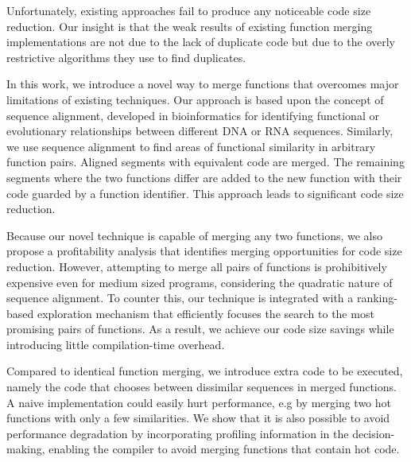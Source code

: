 Unfortunately, existing approaches fail  to produce any noticeable code size reduction.
Our insight is that the weak results of existing function merging implementations are not due to the lack of duplicate code but due to the overly restrictive algorithms they use to find duplicates.


In this work, we introduce a novel way to merge functions that overcomes major limitations of existing techniques.
Our approach is based upon the concept of sequence alignment, developed in bioinformatics for identifying functional or evolutionary relationships between different DNA or RNA sequences.
Similarly, we use sequence alignment to find areas of functional similarity in arbitrary function pairs.
Aligned segments with equivalent code are merged.
The remaining segments where the two functions differ are added to the new function with their code guarded by a function identifier.
This approach leads to significant code size reduction.

Because our novel technique is capable of merging any two functions, we also propose a profitability analysis that identifies merging opportunities for code size reduction.
However, attempting to merge all pairs of functions is prohibitively expensive even for medium sized programs, considering the quadratic nature of sequence alignment.
To counter this, our technique is integrated with a ranking-based exploration mechanism that efficiently focuses the search to the most promising pairs of functions.
As a result, we achieve our code size savings while introducing little compilation-time
overhead.

Compared to identical function merging, we introduce extra code to be executed,
namely the code that chooses between dissimilar sequences in merged functions.
A naive implementation could easily hurt performance, e.g by merging two hot functions
with only a few similarities.
We show that it is also possible to avoid performance degradation by incorporating
profiling information in the decision-making, enabling the compiler to avoid merging functions that contain hot code.

